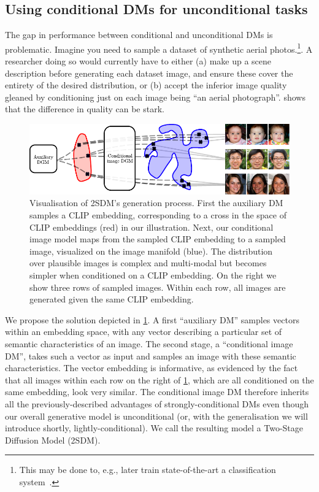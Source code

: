 \subsection{Using conditional DMs for unconditional tasks} \label{sec:2sdm-2sdm-method}

The gap in performance between conditional and unconditional DMs is problematic. Imagine you need to sample a dataset of synthetic aerial photos.\footnote{ This may be done to, e.g., later train state-of-the-art a classification system~\citep{azizi2023synthetic}.}. A researcher doing so would currently have to either (a) make up a scene description before generating each dataset image, and ensure these cover the entirety of the desired distribution, or (b) accept the inferior image quality gleaned by conditioning just on each image being ``an aerial photograph''.   shows that the difference in quality can be stark.

\begin{figure}[t]
    \centering
    \includegraphics[width=\textwidth]{figs/2sdm/vcdm-diagram.pdf}
    \caption{Visualisation of 2SDM's generation process. First the auxiliary DM samples a CLIP embedding, corresponding to a cross in the space of CLIP embeddings (red) in our illustration. Next, our conditional image model maps from the sampled CLIP embedding to a sampled image, visualized on the image manifold (blue). The distribution over plausible images is complex and multi-modal but becomes simpler when conditioned on a CLIP embedding. On the right we show three rows of sampled images. Within each row, all images are generated given the same CLIP embedding.}
    \label{fig:samples}
\end{figure}
We propose the solution depicted in \cref{fig:samples}. A first ``auxiliary DM'' samples vectors within an embedding space, with any vector describing a particular set of semantic characteristics of an image. The second stage, a ``conditional image DM'', takes such a vector as input and samples an image with these semantic characteristics. The vector embedding is informative, as evidenced by the fact that all images within each row on the right of \cref{fig:samples}, which are all conditioned on the same embedding, look very similar. The conditional image DM therefore inherits all the previously-described advantages of strongly-conditional DMs even though our overall generative model is unconditional (or, with the generalisation we will introduce shortly, lightly-conditional). We call the resulting model a Two-Stage Diffusion Model (2SDM).

